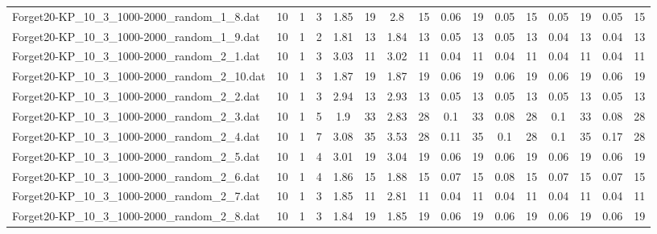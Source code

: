 \begin{sidewaystable}[!ht]
{\begin{tabular}{lccccccccccccccc}
Forget20-KP\_10\_3\_1000-2000\_random\_1\_8.dat & 10 & 1 & 3 & 1.85 & 19 & 2.8 & 15 & 0.06 & 19 &  \textcolor{blue2}{0.05} & 15 &  \textcolor{blue2}{0.05} & 19 &  \textcolor{blue2}{0.05} & 15 \\
Forget20-KP\_10\_3\_1000-2000\_random\_1\_9.dat & 10 & 1 & 2 & 1.81 & 13 & 1.84 & 13 & 0.05 & 13 & 0.05 & 13 &  \textcolor{blue2}{0.04} & 13 &  \textcolor{blue2}{0.04} & 13 \\
Forget20-KP\_10\_3\_1000-2000\_random\_2\_1.dat & 10 & 1 & 3 & 3.03 & 11 & 3.02 & 11 &  \textcolor{blue2}{0.04} & 11 &  \textcolor{blue2}{0.04} & 11 &  \textcolor{blue2}{0.04} & 11 &  \textcolor{blue2}{0.04} & 11 \\
Forget20-KP\_10\_3\_1000-2000\_random\_2\_10.dat & 10 & 1 & 3 & 1.87 & 19 & 1.87 & 19 &  \textcolor{blue2}{0.06} & 19 &  \textcolor{blue2}{0.06} & 19 &  \textcolor{blue2}{0.06} & 19 &  \textcolor{blue2}{0.06} & 19 \\
Forget20-KP\_10\_3\_1000-2000\_random\_2\_2.dat & 10 & 1 & 3 & 2.94 & 13 & 2.93 & 13 &  \textcolor{blue2}{0.05} & 13 &  \textcolor{blue2}{0.05} & 13 &  \textcolor{blue2}{0.05} & 13 &  \textcolor{blue2}{0.05} & 13 \\
Forget20-KP\_10\_3\_1000-2000\_random\_2\_3.dat & 10 & 1 & 5 & 1.9 & 33 & 2.83 & 28 & 0.1 & 33 &  \textcolor{blue2}{0.08} & 28 & 0.1 & 33 &  \textcolor{blue2}{0.08} & 28 \\
Forget20-KP\_10\_3\_1000-2000\_random\_2\_4.dat & 10 & 1 & 7 & 3.08 & 35 & 3.53 & 28 & 0.11 & 35 & 0.1 & 28 & 0.1 & 35 & 0.17 & 28 \\
Forget20-KP\_10\_3\_1000-2000\_random\_2\_5.dat & 10 & 1 & 4 & 3.01 & 19 & 3.04 & 19 &  \textcolor{blue2}{0.06} & 19 &  \textcolor{blue2}{0.06} & 19 &  \textcolor{blue2}{0.06} & 19 &  \textcolor{blue2}{0.06} & 19 \\
Forget20-KP\_10\_3\_1000-2000\_random\_2\_6.dat & 10 & 1 & 4 & 1.86 & 15 & 1.88 & 15 &  \textcolor{blue2}{0.07} & 15 & 0.08 & 15 &  \textcolor{blue2}{0.07} & 15 &  \textcolor{blue2}{0.07} & 15 \\
Forget20-KP\_10\_3\_1000-2000\_random\_2\_7.dat & 10 & 1 & 3 & 1.85 & 11 & 2.81 & 11 &  \textcolor{blue2}{0.04} & 11 &  \textcolor{blue2}{0.04} & 11 &  \textcolor{blue2}{0.04} & 11 &  \textcolor{blue2}{0.04} & 11 \\
Forget20-KP\_10\_3\_1000-2000\_random\_2\_8.dat & 10 & 1 & 3 & 1.84 & 19 & 1.85 & 19 &  \textcolor{blue2}{0.06} & 19 &  \textcolor{blue2}{0.06} & 19 &  \textcolor{blue2}{0.06} & 19 &  \textcolor{blue2}{0.06} & 19 \\

\end{tabular}}
\end{sidewaystable}
